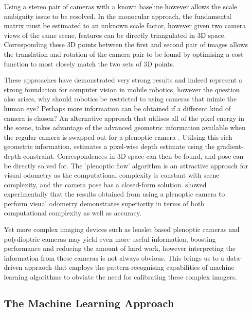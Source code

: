 \documentclass[openany]{book}
\begin{document}
Using a stereo pair of cameras with a known baseline however allows the scale ambiguity issue to be resolved. In the monocular approach, the fundamental matrix must be estimated to an unknown scale factor, however given two camera views of the same scene, features can be directly triangulated in 3D space. Corresponding these 3D points between the first and second pair of images allows the translation and rotation of the camera pair to be found by optimising a cost function to most closely match the two sets of 3D points. 

These approaches have demonstrated very strong results and indeed represent a strong foundation for computer vision in mobile robotics, however the question also arises, why should robotics be restricted to using cameras that mimic the human eye? Perhaps more information can be obtained if a different kind of camera is chosen? An alternative approach that utilises all of the pixel energy in the scene, takes advantage of the advanced geometric information available when the regular camera is swapped out for a plenoptic camera \cite{dansereau2011plenopticflow}. Utilsing this rich geometric information, \cite{dansereau2011plenopticflow} estimates a pixel-wise depth estimate using the gradient-depth constraint. Correspondences in 3D space can then be found, and pose can be directly solved for. The 'plenoptic flow' algorithm is an attractive approach for visual odometry as the computational complexity is constant with scene complexity, and the camera pose has a closed-form solution. \cite{dong2013plenopticflow} showed experimentally that the results obtained from using a plenoptic camera to perform visual odometry demonstrates superiority in terms of both computational complexity as well as accuracy.

Yet more complex imaging devices such as lenslet based plenoptic cameras and polydioptric cameras may yield even more useful information, boosting performance and reducing the amount of hard work, however interpreting the information from these cameras is not always obvious. This brings us to a data-driven appraoch that employs the pattern-recognising capabilities of machine learning algorithms to obviate the need for calibrating these complex imagers.


\subsection{The Machine Learning Approach}
\end{document}
